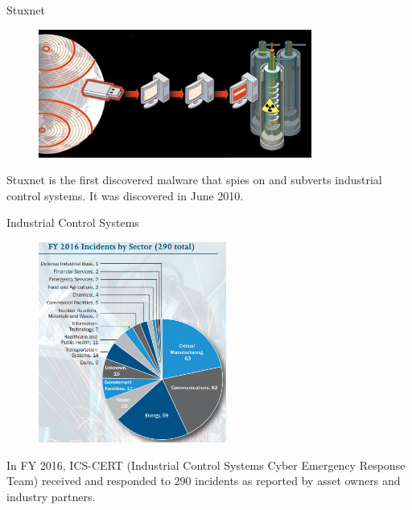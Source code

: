 \documentclass[10pt]{beamer}
\begin{document}
\begin{frame}{Stuxnet}
  \begin{figure}[ht]
    \centering
    \includegraphics[width=0.8\textwidth]{stuxnet.jpg}
  \end{figure}
  Stuxnet is the first discovered malware that spies on and subverts industrial control systems. It was discovered in June 2010. 
\end{frame}

\begin{frame}{Industrial Control Systems}
  \begin{figure}[ht]
    \centering
    \includegraphics[width=0.55\textwidth]{cert.jpg}
  \end{figure}
  In FY 2016, ICS-CERT (Industrial Control Systems Cyber Emergency Response Team) received and responded to 290 incidents as reported by asset owners and industry partners.
\end{frame}

%
%
\end{document}
